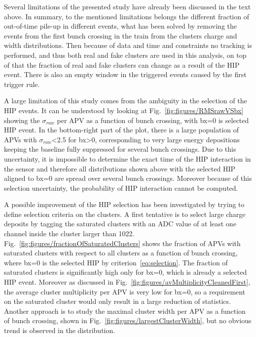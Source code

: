 Several limitations of the presented study have already been discussed in the text above. In summary, to the mentioned limitations belongs the different fraction of out-of-time pile-up in different events, what has been solved by removing the events from the first bunch crossing in the train from the clusters charge and width distributions. Then because of data and time and constraints no tracking is performed, and thus both real and fake clusters are used in this analysis, on top of that the fraction of real and fake clusters can change as a result of the HIP event. There is also an empty window in the triggered events caused by the first trigger rule.


A large limitation of this study comes from the ambiguity in the selection of the HIP events. It can be understood by looking at Fig.~\ref{fig:figures/RMSrawVSbx} showing the $\sigma_{raw}$ per APV as a function of bunch crossing, with bx=0 is selected HIP event. In the bottom-right part of the plot, there is a large population of APVs with $\sigma_{raw}$<2.5 for bx>0, corresponding to very large energy depositions keeping the baseline fully suppressed for several bunch crossings. Due to this uncertainty, it is impossible to determine the exact time of the HIP interaction in the sensor and therefore all distributions shown above with the selected HIP aligned to bx=0 are spread over several bunch crossings. Moreover because of this selection uncertainty, the probability of HIP interaction cannot be computed. 


A possible improvement of the HIP selection has been investigated by trying to define selection criteria on the clusters. A first tentative is to select large charge deposits by tagging the saturated clusters with an ADC value of at least one channel inside the cluster larger than 1022. Fig.~\ref{fig:figures/fractionOfSaturatedClusters} shows the fraction of APVs with saturated clusters with respect to all clusters as a function of bunch crossing, where bx=0 is the selected HIP by criterion~\ref{eq:selection}. The fraction of saturated clusters is significantly high only for bx=0, which is already a selected HIP event. Moreover as discussed in Fig.~\ref{fig:figures/avMultiplicityCleanedFirst}, the average cluster multiplicity per APV is very low for bx=0, so a requirement on the saturated cluster would only result in a large reduction of statistics. Another approach is to study the maximal cluster width per APV as a function of bunch crossing, shown in Fig.~\ref{fig:figures/largestClusterWidth}, but no obvious trend is observed in the distribution. 

